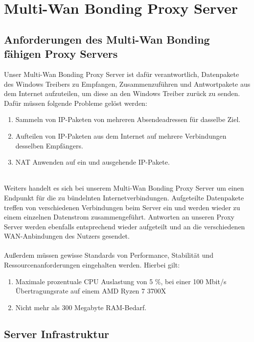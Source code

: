 \chapter{Multi-Wan Bonding Proxy Server}
\label{cha:Multi-WanBondingProxyServer}

\section{Anforderungen des Multi-Wan Bonding fähigen Proxy Servers}
Unser Multi-Wan Bonding Proxy Server ist dafür verantwortlich, Datenpakete des Windows Treibers zu Empfangen, Zusammenzuführen und Antwortpakete aus dem Internet aufzuteilen, um diese an den Windows Treiber zurück zu senden. Dafür müssen folgende Probleme gelöst werden:
\\
\begin{enumerate}
    \item Sammeln von IP-Paketen von mehreren Absendeadressen für dasselbe Ziel.
    \item Aufteilen von IP-Paketen aus dem Internet auf mehrere Verbindungen desselben Empfängers.
    \item NAT Anwenden auf ein und ausgehende IP-Pakete.
\end{enumerate}
\ \\
Weiters handelt es sich bei unserem Multi-Wan Bonding Proxy Server um einen Endpunkt für die zu bündelnten Internetverbindungen. Aufgeteilte Datenpakete treffen von verschiedenen Verbindungen beim Server ein und werden wieder zu einem einzelnen Datenstrom zusammengeführt. Antworten an unseren Proxy Server werden ebenfalls entsprechend wieder aufgeteilt und an die verschiedenen WAN-Anbindungen des Nutzers gesendet. 
\\\\
Außerdem müssen gewisse Standards von Performance, Stabilität und Ressourcenanforderungen eingehalten werden. Hierbei gilt:
\\
\begin{enumerate}
    \item Maximale prozentuale CPU Auslastung von 5 {\%}, bei einer 100 Mbit/s Übertragungsrate auf einem AMD Ryzen 7 3700X
    \item Nicht mehr als 300 Megabyte RAM-Bedarf.
\end{enumerate}

\newpage
\section{Server Infrastruktur}
